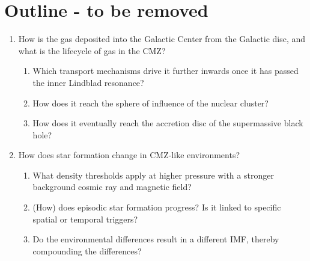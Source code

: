 \documentclass[modern]{aastex62}
\begin{document}
\section{Outline - to be removed}
\begin{enumerate}
    \item How is the gas deposited into the Galactic Center from the Galactic
        disc, and what is the lifecycle of gas in the CMZ?
    \begin{enumerate}
        \item Which transport mechanisms drive it further inwards once it has passed the inner Lindblad resonance?
        \item How does it reach the sphere of influence of the nuclear cluster?
        \item How does it eventually reach the accretion disc of the supermassive black hole?
    \end{enumerate}
    \item How does star formation change in CMZ-like environments?
        \begin{enumerate}
            \item What density thresholds apply at higher pressure with a stronger background cosmic ray and magnetic field?
            \item (How) does episodic star formation progress?  Is it linked to specific spatial or temporal triggers?
            \item Do the environmental differences result in a different IMF, thereby compounding the differences?
        \end{enumerate}
\end{enumerate}
\end{document}
